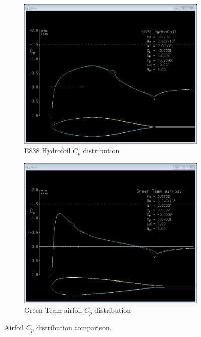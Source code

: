 \begin{figure}[H]
\centering
\begin{subfigure}[b]{.5\textwidth}
  \centering
  \includegraphics[width=0.9\linewidth]{Aeroshell/HydrofoilCp.png}
  \caption{\label{fig:hydrofoil_cp}E838 Hydrofoil $C_p$ distribution}
\end{subfigure}%
\begin{subfigure}[b]{.5\textwidth}
  \centering
  \includegraphics[width=0.9\linewidth]{Aeroshell/GreenTeamCp.png}
  \caption{\label{fig:greenteam_cp}Green Team airfoil $C_p$ distribution}
\end{subfigure}
\caption{\label{fig:cp}Airfoil $C_p$ distribution comparison.}
\end{figure}


